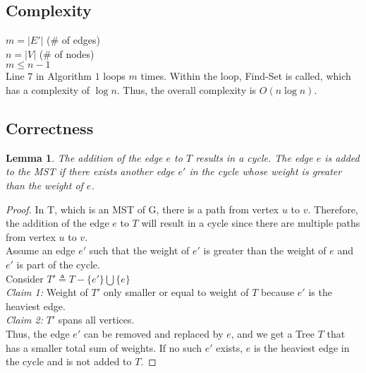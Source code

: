 \documentclass{article}
\theoremstyle{definition}
\theoremstyle{remark}
\theoremstyle{plain}
\newtheorem{lem}[thm]{Lemma}
\begin{document}
\subsection{Complexity}
$m = |E'|$ (\# of edges) \\
$n = |V|$ (\# of nodes) \\
$m \leq n-1$\\
Line $7$ in Algorithm $1$ loops $m$ times. Within the loop, Find-Set is called, which has a complexity of $\log n$. Thus, the overall complexity is $O( n \log n)$.
\pagebreak
\subsection{Correctness}
\begin{lem}
The addition of the edge $e$ to $T$ results in a cycle. The edge $e$ is added to the MST if there exists another edge $e'$ in the cycle whose weight is greater than the weight of $e$.
\end{lem}
\begin{proof} 
In T, which is an MST of G, there is a path from vertex $u$ to $v$. Therefore, the addition of the edge $e$ to $T$ will result in a cycle since there are multiple paths from vertex $u$ to $v$. \\
Assume an edge $e'$ such that the weight of $e'$ is greater than the weight of $e$ and $e'$ is part of the cycle. \\
Consider $T' \triangleq T - \{ e' \} \bigcup \{ e\}$\\
\textsl{Claim 1:} Weight of $T'$ only smaller or equal to weight of $T$ because $e'$ is the heaviest edge.\\
\textsl{Claim 2:} $T'$ spans all vertices.\\
Thus, the edge $e'$ can be removed and replaced by $e$, and we get a Tree $T$ that has a smaller total sum of weights.
If no such $e'$ exists, $e$ is the heaviest edge in the cycle and is not added to $T$. 
\end{proof}
\end{document}
